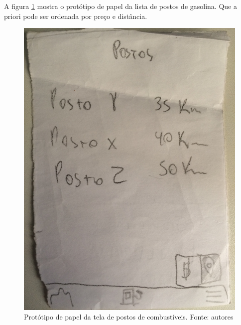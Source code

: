 A figura \ref{img:prototipo_de_papel_lista_postos} mostra o protótipo de papel da lista de postos de gasolina. Que a priori pode ser ordenada por preço e distância.
\begin{figure}[H]
    \centering
    \includegraphics[scale=0.1, angle=-90]{figuras/prototipo_papel_lista_de_postos.jpg}
    \caption[Protótipo de papel da tela de postos de combustíveis]{Protótipo de papel da tela de postos de combustíveis. Fonte: autores}
    \label{img:prototipo_de_papel_lista_postos}
\end{figure}
 \pagebreak

